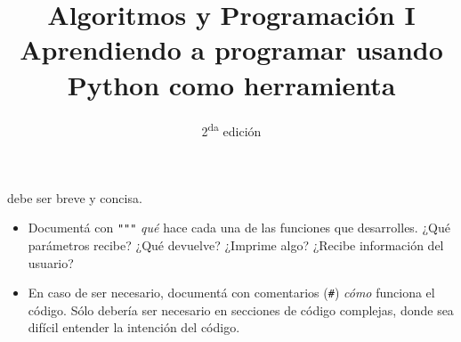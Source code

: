\documentclass[11pt,spanish,a4paper,twoside,openany]{book}
\theoremstyle{definition}
\theoremstyle{definition}
\theoremstyle{remark}
\begin{document}
\begin{extract}
\begin{itemize}
        debe ser breve y concisa.
    \begin{itemize}
        \item Documentá con \verb|"""| \emph{qué} hace cada una de las funciones
            que desarrolles. ¿Qué parámetros recibe? ¿Qué devuelve? ¿Imprime algo?
            ¿Recibe información del usuario?
        \item En caso de ser necesario, documentá con comentarios (\verb|#|) \emph{cómo} funciona
            el código. Sólo debería ser necesario en secciones de código complejas, donde sea difícil
            entender la intención del código.
    \end{itemize}
\end{itemize}

\newpage

\end{extract}

\title{{\bf Algoritmos y Programación I} \\ Aprendiendo a programar usando Python como herramienta}
\date{2\textsuperscript{da} edición}
\maketitle


\tableofcontents














%
\begin{extract}
\end{extract}


\end{document}
